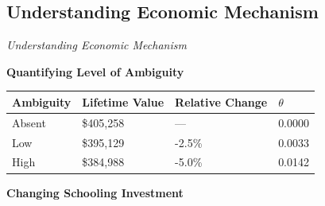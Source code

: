 \subsection{Understanding Economic Mechanism}
\begin{frame}\begin{center}
\LARGE\textit{Understanding Economic Mechanism}
\end{center}\end{frame}
\begin{frame}
\textbf{Quantifying Level of Ambiguity}\vspace{0.3cm}
\begin{center}
  \begin{tabular}{C{1.8cm}  C{2.5cm} C{3.0cm} C{1.5cm}}\toprule
     Ambiguity  & Lifetime Value   & Relative Change & $\theta$\\\toprule
    Absent  & \$405,258    & --- & 0.0000\\
    Low     & \$395,129   & -2.5\%& 0.0033\\
    High    & \$384,988    & -5.0\%& 0.0142\\\bottomrule
  \end{tabular}
\end{center}
\end{frame}
\begin{frame}
\begin{center}\textbf{Changing Schooling Investment}\vspace{0.3cm}
\end{center}
\end{frame}
